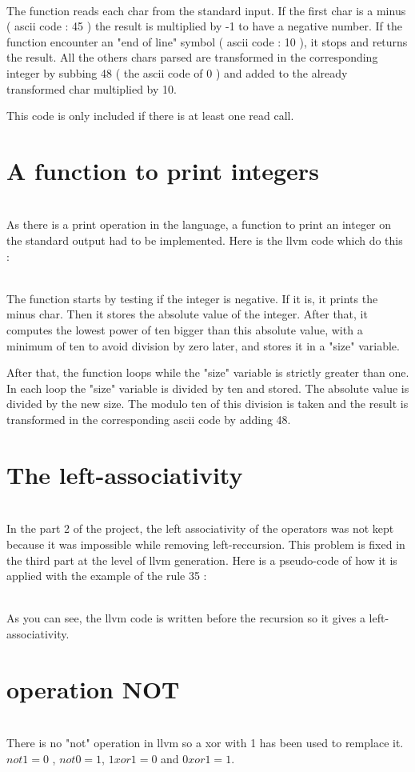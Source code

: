 \documentclass[a4paper,10pt]{report}
\begin{document}


\hfill \\
The function reads each char from the standard input. If the first char is a minus ( ascii code : 45 ) the result is multiplied by -1 to have a negative number. If the function encounter an "end of line" symbol ( ascii code : 10 ), it stops and returns the result. All the others chars parsed are transformed in the corresponding integer by subbing 48 ( the ascii code of 0 ) and added to the already transformed char multiplied by 10.

This code is only included if there is at least one read call.

\section*{A function to print integers}

\hfill \\
As there is a print operation in the language, a function to print an integer on the standard output had to be implemented. Here is the llvm code which do this :



\hfill \\
The function starts by testing if the integer is negative. If it is, it prints the minus char. Then it stores the absolute value of the integer. After that, it computes the lowest power of ten bigger than this absolute value, with a minimum of ten to avoid division by zero later, and stores it in a "size" variable.

After that, the function loops while the "size" variable is strictly greater than one. In each loop the "size" variable is divided by ten and stored. The absolute value is divided by the new size. The modulo ten of this division is taken and the result is transformed in the corresponding ascii code by adding 48.

\section*{The left-associativity}

\hfill \\
In the part 2 of the project, the left associativity of the operators was not kept because it was impossible while removing left-reccursion. This problem is fixed in the third part at the level of llvm generation. Here is a pseudo-code of how it is applied with the example of the rule 35 :




\hfill \\
As you can see, the llvm code is written before the recursion so it gives a left-associativity.

\section*{operation NOT}

\hfill \\
There is no "not" operation in llvm so a xor with 1 has been used to remplace it.
$ not 1 = 0 $ , $not 0 = 1$, $1 xor 1 = 0$ and $0 xor 1 = 1$.
\end{document}
